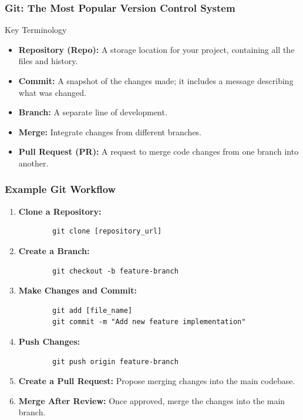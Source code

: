 \documentclass{beamer}
\begin{document}
\begin{frame}[fragile]
    \frametitle{Git: The Most Popular Version Control System}
    \begin{block}{Key Terminology}
        \begin{itemize}
            \item \textbf{Repository (Repo):} A storage location for your project, containing all the files and history.
            \item \textbf{Commit:} A snapshot of the changes made; it includes a message describing what was changed.
            \item \textbf{Branch:} A separate line of development.
            \item \textbf{Merge:} Integrate changes from different branches.
            \item \textbf{Pull Request (PR):} A request to merge code changes from one branch into another.
        \end{itemize}
    \end{block}
\end{frame}

\begin{frame}[fragile]
    \frametitle{Example Git Workflow}
    \begin{enumerate}
        \item \textbf{Clone a Repository:}
        \begin{lstlisting}
        git clone [repository_url]
        \end{lstlisting}
        
        \item \textbf{Create a Branch:}
        \begin{lstlisting}
        git checkout -b feature-branch
        \end{lstlisting}
        
        \item \textbf{Make Changes and Commit:}
        \begin{lstlisting}
        git add [file_name]
        git commit -m "Add new feature implementation"
        \end{lstlisting}
        
        \item \textbf{Push Changes:}
        \begin{lstlisting}
        git push origin feature-branch
        \end{lstlisting}
        
        \item \textbf{Create a Pull Request:} Propose merging changes into the main codebase.
        \item \textbf{Merge After Review:} Once approved, merge the changes into the main branch.
    \end{enumerate}
\end{frame}
\end{document}
